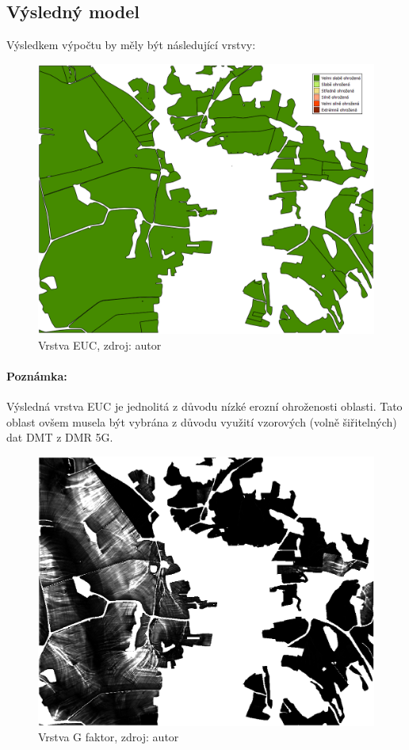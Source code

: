 \subsection{Výsledný model} Výsledkem výpočtu by měly být následující
vrstvy:
\begin{figure}[H] \centering
		\includegraphics[width=.5\textwidth]{./pictures/euc_layer.png}
		\caption[Vrstva EUC]{Vrstva EUC, zdroj: autor}
		\label{euc_sample}
\end{figure}
\paragraph{Poznámka:} Výsledná vrstva EUC je jednolitá z důvodu nízké
erozní ohroženosti oblasti. Tato oblast ovšem musela být vybrána z
důvodu využití vzorových (volně šiřitelných) dat DMT z DMR 5G.
\begin{figure}[H] \centering
		\includegraphics[width=.5\textwidth]{./pictures/lokalni_eroze_layer.png}
		\caption[Vrstva G faktor]{Vrstva G faktor, zdroj:
autor}
		\label{g_sample}
              \end{figure}
              

